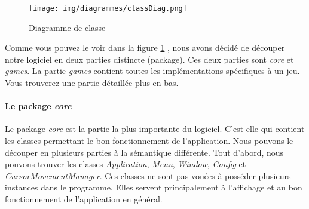 \documentclass{polytech/polytech}
\begin{document}
\pagebreak
\begin{figure}
    \centering
    \texttt{[image: img/diagrammes/classDiag.png]}
    \caption{Diagramme de classe}
    \label{fig:class_diag}
\end{figure}

Comme vous pouvez le voir dans la figure \ref{fig:class_diag} , nous avons décidé de découper notre logiciel en deux parties distincte (package). Ces deux parties sont \textit{core} et \textit{games}. La partie \textit{games} contient toutes les implémentations spécifiques à un jeu. Vous trouverez une partie détaillée plus en bas.

\paragraph{Le package \textit{core}}
Le package \textit{core} est la partie la plus importante du logiciel. C'est elle qui contient les classes permettant le bon fonctionnement de l'application. Nous pouvons le découper en plusieurs parties à la sémantique différente. 
Tout d'abord, nous pouvons trouver les classes \textit{Application}, \textit{Menu}, \textit{Window}, \textit{Config} et \textit{CursorMovementManager}. Ces classes ne sont pas vouées à posséder plusieurs instances dans le programme.  Elles servent principalement à l'affichage et au bon fonctionnement de l'application en général. 
\end{document}
